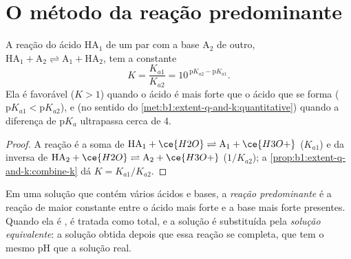 \section{O método da reação predominante}

\begin{proposition}\label{prop:b1:predominant-reaction:k-of-reaction}
A reação do ácido $\mathrm{HA}_1$ de um par com a base $\mathrm{A}_2$ de
outro,
$\mathrm{HA}_1 + \mathrm{A}_2 \rightleftharpoons \mathrm{A}_1 + \mathrm{HA}_2$,
tem a constante
\[
  K = \frac{K_{a1}}{K_{a2}} = 10^{\,\mathrm{p}K_{a2} - \mathrm{p}K_{a1}} .
\]
Ela é favorável ($K > 1$) quando o ácido é mais forte que o ácido que se
forma ($\mathrm{p}K_{a1} < \mathrm{p}K_{a2}$), e  (no sentido
do \cref{met:b1:extent-q-and-k:quantitative}) quando a diferença de
$\mathrm{p}K_a$ ultrapassa cerca de 4.
\end{proposition}

\begin{proof}
A reação é a soma de $\mathrm{HA}_1 + \ce{H2O} \rightleftharpoons
\mathrm{A}_1 + \ce{H3O+}$ ($K_{a1}$) e da inversa de $\mathrm{HA}_2 +
\ce{H2O} \rightleftharpoons \mathrm{A}_2 + \ce{H3O+}$ ($1/K_{a2}$); a
\cref{prop:b1:extent-q-and-k:combine-k} dá $K = K_{a1}/K_{a2}$.
\end{proof}

\begin{definition}\label{def:b1:predominant-reaction:predominant-reaction}
Em uma solução que contém vários ácidos e bases, a \emph{reação
predominante} é a reação de maior constante
entre o ácido mais forte e a base mais forte presentes. Quando ela é
, é tratada como total, e a solução é substituída pela
\emph{solução equivalente}: a solução obtida
depois que essa reação se completa, que tem o mesmo pH que a solução
real.
\end{definition}

